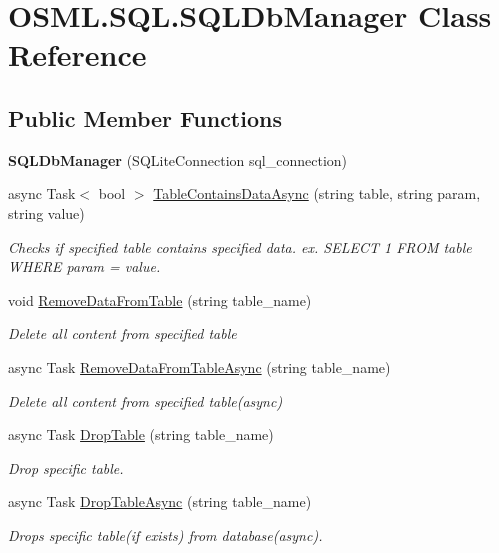 \hypertarget{classOSML_1_1SQL_1_1SQLDbManager}{}\section{O\+S\+M\+L.\+S\+Q\+L.\+S\+Q\+L\+Db\+Manager Class Reference}
\label{classOSML_1_1SQL_1_1SQLDbManager}
\subsection*{Public Member Functions}
\begin{DoxyCompactItemize}
\item 
\mbox{\label{classOSML_1_1SQL_1_1SQLDbManager_ad26fb300a212ef1b84ff8991c9a27939}} 
{\bfseries S\+Q\+L\+Db\+Manager} (S\+Q\+Lite\+Connection sql\+\_\+connection)
\item 
async Task$<$ bool $>$ \mbox{\hyperlink{classOSML_1_1SQL_1_1SQLDbManager_a03ff59fabe73b74907fd714a3f84311e}{Table\+Contains\+Data\+Async}} (string table, string param, string value)
\begin{DoxyCompactList}\small\item\em Checks if specified table contains specified data. ex. S\+E\+L\+E\+CT 1 F\+R\+OM table W\+H\+E\+RE param = value. \end{DoxyCompactList}\item 
void \mbox{\hyperlink{classOSML_1_1SQL_1_1SQLDbManager_a5720ab26bbf742446eac817e80ea22a6}{Remove\+Data\+From\+Table}} (string table\+\_\+name)
\begin{DoxyCompactList}\small\item\em Delete all content from specified table \end{DoxyCompactList}\item 
async Task \mbox{\hyperlink{classOSML_1_1SQL_1_1SQLDbManager_a05cda1ed133ece2d363f531c865b76de}{Remove\+Data\+From\+Table\+Async}} (string table\+\_\+name)
\begin{DoxyCompactList}\small\item\em Delete all content from specified table(async) \end{DoxyCompactList}\item 
async Task \mbox{\hyperlink{classOSML_1_1SQL_1_1SQLDbManager_a5118e36397a914f95ee1cd51675c7d06}{Drop\+Table}} (string table\+\_\+name)
\begin{DoxyCompactList}\small\item\em Drop specific table. \end{DoxyCompactList}\item 
async Task \mbox{\hyperlink{classOSML_1_1SQL_1_1SQLDbManager_afaaaf7303202a86ee7730e7b4a108302}{Drop\+Table\+Async}} (string table\+\_\+name)
\begin{DoxyCompactList}\small\item\em Drops specific table(if exists) from database(async). \end{DoxyCompactList}\end{DoxyCompactItemize}
